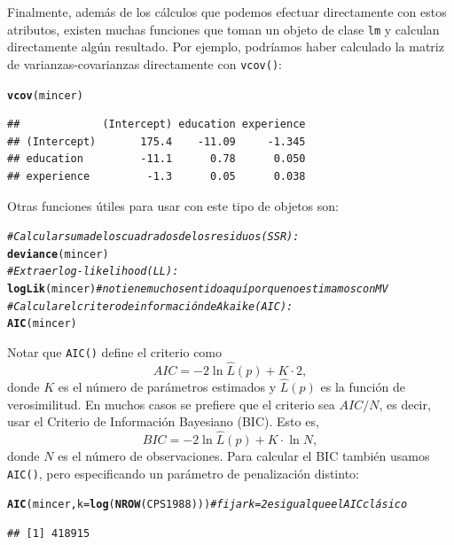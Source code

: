 \documentclass{article}\usepackage[]{graphicx}\usepackage[]{color}
\makeatletter
\newcommand{\hlcom}[1]{\textcolor[rgb]{0.678,0.584,0.686}{\textit{#1}}}%
\newcommand{\hlstd}[1]{\textcolor[rgb]{0.345,0.345,0.345}{#1}}%
\newcommand{\hlkwc}[1]{\textcolor[rgb]{0.333,0.667,0.333}{#1}}%
\newcommand{\hlkwd}[1]{\textcolor[rgb]{0.737,0.353,0.396}{\textbf{#1}}}%
\newenvironment{kframe}{%
 \def\at@end@of@kframe{}%
 \ifinner\ifhmode%
  \def\at@end@of@kframe{\end{minipage}}%
  \begin{minipage}{\columnwidth}%
 \fi\fi%
 \def\FrameCommand##1{\hskip\@totalleftmargin \hskip-\fboxsep
 \colorbox{shadecolor}{##1}\hskip-\fboxsep
     \hskip-\linewidth \hskip-\@totalleftmargin \hskip\columnwidth}%
 \MakeFramed {\advance\hsize-\width
   \@totalleftmargin\z@ \linewidth\hsize
   \@setminipage}}%
 {\par\unskip\endMakeFramed%
 \at@end@of@kframe}
\newenvironment{knitrout}{}{} %
\makeatother
\begin{document}
Finalmente, además de los cálculos que podemos efectuar directamente con estos atributos, existen muchas funciones que toman un objeto de clase \verb|lm| y calculan directamente algún resultado. Por ejemplo, podríamos haber calculado la matriz de varianzas-covarianzas directamente con \verb|vcov()|:

\begin{knitrout}
\color{fgcolor}\begin{kframe}
\begin{alltt}
\hlkwd{vcov}\hlstd{(mincer)}
\end{alltt}
\begin{verbatim}
##             (Intercept) education experience
## (Intercept)       175.4    -11.09     -1.345
## education         -11.1      0.78      0.050
## experience         -1.3      0.05      0.038
\end{verbatim}
\end{kframe}
\end{knitrout}

Otras funciones útiles para usar con este tipo de objetos son:

\begin{knitrout}
\color{fgcolor}\begin{kframe}
\begin{alltt}
\hlcom{# Calcular suma de los cuadrados de los residuos (SSR):}
\hlkwd{deviance}\hlstd{(mincer)}
\hlcom{# Extraer log-likelihood (LL):}
\hlkwd{logLik}\hlstd{(mincer)} \hlcom{# no tiene mucho sentido aquí porque no estimamos con MV}
\hlcom{# Calcular el critero de información de Akaike (AIC):}
\hlkwd{AIC}\hlstd{(mincer)}
\end{alltt}
\end{kframe}
\end{knitrout}

Notar que \verb|AIC()| define el criterio como
\begin{equation}
AIC = -2 \ln \widehat L(p) + K\cdot 2,
\end{equation}
donde $K$ es el número de parámetros estimados y $\widehat L(p)$ es la función de verosimilitud. En muchos casos se prefiere que el criterio sea $AIC/N$, es decir, usar el Criterio de Información Bayesiano (BIC). Esto es,
\begin{equation}
BIC = -2 \ln \widehat L(p) + K \cdot \ln N,
\end{equation}
donde $N$ es el número de observaciones.
Para calcular el BIC también usamos \verb|AIC()|, pero especificando un parámetro de penalización distinto:
\begin{knitrout}
\color{fgcolor}\begin{kframe}
\begin{alltt}
\hlkwd{AIC}\hlstd{(mincer,} \hlkwc{k} \hlstd{=} \hlkwd{log}\hlstd{(}\hlkwd{NROW}\hlstd{(CPS1988)))} \hlcom{# fijar k=2 es igual que el AIC clásico}
\end{alltt}
\begin{verbatim}
## [1] 418915
\end{verbatim}
\end{kframe}
\end{knitrout}
\end{document}
